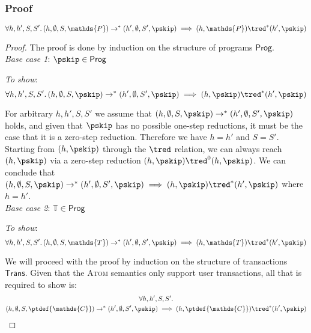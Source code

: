 \subsubsection{Proof}

\begin{thm}

\label{thm:atom}

\[
	\forall h, h', S, S' \ldotp
	(h, \emptyset, S, \mathds{P}) \rightarrow^* (h', \emptyset, S', \pskip) \implies 
	(h, \mathds{P}) \tred^* (h', \pskip)
\]

{\parindent0pt
\begin{proof}
The proof is done by induction on the structure of programs $\mathsf{Prog}$. \\

\textit{Base case 1}: $\pskip \in \mathsf{Prog}$

\textit{To show}:
\[
	\forall h, h', S, S' \ldotp
	(h, \emptyset, S, \pskip) \rightarrow^* (h', \emptyset, S', \pskip) \implies 
	(h, \pskip) \tred^* (h', \pskip)
\]

For arbitrary $h, h', S, S'$ we assume that $(h, \emptyset, S, \pskip) \rightarrow^* (h', \emptyset, S', \pskip)$ holds, and given that $\pskip$ has no possible one-step reductions, it must be the case that it is a zero-step reduction. Therefore we have $h = h'$ and $S = S'$. Starting from $(h, \pskip)$ through the $\tred$ relation, we can always reach $(h, \pskip)$ via a zero-step reduction $(h, \pskip) \tred^0 (h, \pskip)$. We can conclude that $(h, \emptyset, S, \pskip) \rightarrow^* (h', \emptyset, S', \pskip) \implies (h, \pskip) \tred^* (h', \pskip)$ where $h = h'$. \\

\textit{Base case 2}: $\mathds{T} \in \mathsf{Prog}$

\textit{To show}:
\[
	\forall h, h', S, S' \ldotp
	(h, \emptyset, S, \mathds{T}) \rightarrow^* (h', \emptyset, S', \pskip) \implies 
	(h, \mathds{T}) \tred^* (h', \pskip)
\]

We will proceed with the proof by induction on the structure of transactions $\mathsf{Trans}$. Given that the \textsc{Atom} semantics only support user transactions, all that is required to show is:
\begin{gather*}
	\forall h, h', S, S' \ldotp \\
	(h, \emptyset, S, \ptdef{\mathds{C}}) \rightarrow^* (h', \emptyset, S', \pskip) \implies 
	(h, \ptdef{\mathds{C}}) \tred^* (h', \pskip)
\end{gather*}


\end{proof}}
\end{thm}
